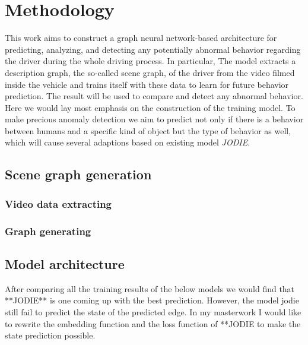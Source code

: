 \chapter{Methodology}\label{chapter:methodology}

This work aims to construct a graph neural network-based architecture for predicting, analyzing, and detecting any potentially abnormal behavior regarding the driver during the whole driving process. In particular, The model extracts a description graph, the so-called scene graph, of the driver from the video filmed inside the vehicle and trains itself with these data to learn for future behavior prediction. The result will be used to compare and detect any abnormal behavior. Here we would lay most emphasis on the construction of the training model. To make precious anomaly detection we aim to predict not only if there is a behavior between humans and a specific kind of object but the type of behavior as well, which will cause several adaptions based on existing model \textit{JODIE}.





\section{Scene graph generation}


    \subsection{Video data extracting}

    \subsection{Graph generating}

\section{Model architecture}




After comparing all the training results of the below models we would find that **JODIE** is one coming up with the best prediction. However, the model jodie still fail to predict the state of the predicted edge.
In my masterwork I would like to rewrite the embedding function and the loss function of **JODIE to make the state prediction possible.

